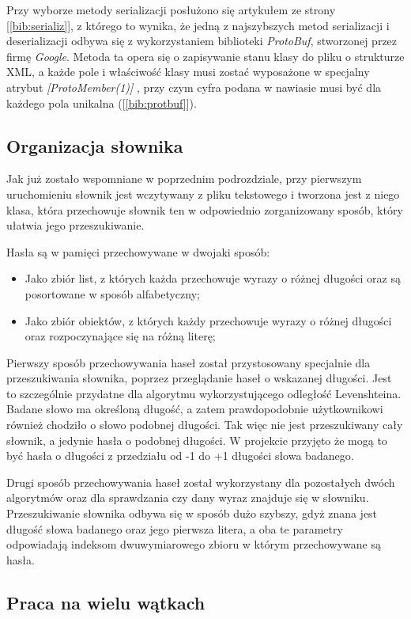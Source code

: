 Przy wyborze metody serializacji posłużono się artykułem ze strony [\ref{bib:serializ}], z którego to wynika, że jedną z najszybszych metod serializacji i deserializacji odbywa się z wykorzystaniem biblioteki \textit{ProtoBuf}, stworzonej przez firmę \textit{Google}. Metoda ta opera się o zapisywanie stanu klasy do pliku o strukturze XML, a każde pole i właściwość klasy musi zostać wyposażone w specjalny atrybut \textit{[ProtoMember(1)]} , przy czym cyfra podana w nawiasie musi być dla każdego pola unikalna ([\ref{bib:protbuf}]).

\subsection{Organizacja słownika}

Jak już zostało wspomniane w poprzednim podrozdziale, przy pierwszym uruchomieniu słownik jest wczytywany z pliku tekstowego i tworzona jest z niego klasa, która przechowuje słownik ten w odpowiednio zorganizowany sposób, który ułatwia jego przeszukiwanie. 

Hasła są w pamięci przechowywane w dwojaki sposób:
\begin{itemize}
	\item Jako zbiór list, z których każda przechowuje wyrazy o różnej długości oraz są posortowane w sposób alfabetyczny;
	\item Jako zbiór obiektów, z których każdy przechowuje wyrazy o różnej długości oraz rozpoczynające się na różną literę;
\end{itemize}

Pierwszy sposób przechowywania haseł został przystosowany specjalnie dla przeszukiwania słownika, poprzez przeglądanie haseł o wskazanej długości. Jest to szczególnie przydatne dla algorytmu wykorzystującego odległość Levenshteina. Badane słowo ma określoną długość, a zatem prawdopodobnie użytkownikowi również chodziło o słowo podobnej długości. Tak więc nie jest przeszukiwany cały słownik, a jedynie hasła o podobnej długości. W projekcie przyjęto że mogą to być hasła o długości z przedziału od -1 do +1 długości słowa badanego.

Drugi sposób przechowywania haseł został wykorzystany dla pozostałych dwóch algorytmów oraz dla sprawdzania czy dany wyraz znajduje się w słowniku. Przeszukiwanie słownika odbywa się w sposób dużo szybszy, gdyż znana jest długość słowa badanego oraz jego pierwsza litera, a oba te parametry odpowiadają indeksom dwuwymiarowego zbioru w którym przechowywane są hasła.

\subsection{Praca na wielu wątkach}


